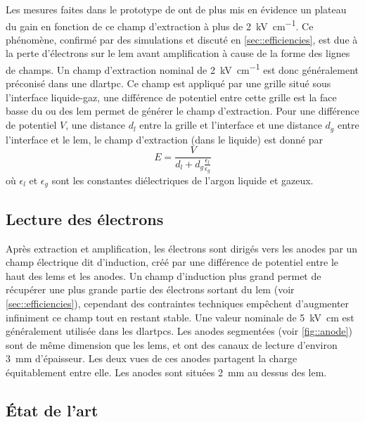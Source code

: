       Les mesures faites dans le prototype de \threeL{} ont de plus mis en évidence un plateau du gain en fonction de ce champ d'extraction à plus de \SI{2}{\kilo\volt\per\centi\meter}. Ce phénomène, confirmé par des simulations et discuté en \autoref{sec::efficiencies}, est due à la perte d'électrons sur le \gls{lem} avant amplification à cause de la forme des lignes de champs. Un champ d'extraction nominal de \SI{2}{\kilo\volt\per\centi\meter} est donc généralement préconisé dans une \gls{dlartpc}. Ce champ est appliqué par une grille situé sous l'interface liquide-gaz, une différence de potentiel entre cette grille est la face basse du ou des \gls{lem} permet de générer le champ d'extraction. Pour une différence de potentiel $V$, une distance $d_l$ entre la grille et l'interface et une distance $d_g$ entre l'interface et le \gls{lem}, le champ d'extraction (dans le liquide) est donné par
      \begin{equation}
        E = \frac{V}{d_l + d_g\frac{\epsilon_l}{\epsilon_g}}
      \end{equation}
      où $\epsilon_l$ et $\epsilon_g$ sont les constantes diélectriques de l'argon liquide et gazeux.

    \subsection{Lecture des électrons}
    
      Après extraction et amplification, les électrons sont dirigés vers les anodes par un champ électrique dit d'induction, créé par une différence de potentiel entre le haut des \glspl{lem} et les anodes. Un champ d'induction plus grand permet de récupérer une plus grande partie des électrons sortant du \gls{lem} (voir \autoref{sec::efficiencies}), cependant des contraintes techniques empêchent d'augmenter infiniment ce champ tout en restant stable. Une valeur nominale de \SI{5}{\kilo\volt\centi\meter} est généralement utilisée dans les \glspl{dlartpc}. Les anodes segmentées (voir \autoref{fig::anode}) sont de même dimension que les \glspl{lem}, et ont des canaux de lecture d'environ \SI{3}{\milli\meter} d'épaisseur. Les deux vues de ces anodes partagent la charge équitablement entre elle. Les anodes sont situées \SI{2}{\milli\meter} au dessus des \gls{lem}.

    \subsection{État de l'art}

